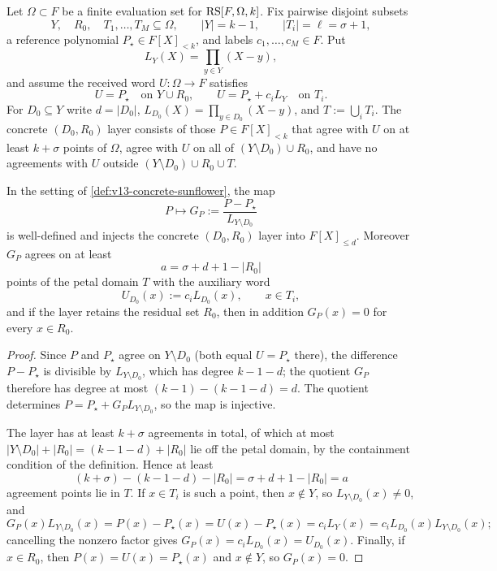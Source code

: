 \begin{definition}\label{def:v13-concrete-sunflower}
Let $\Omega\subset F$ be a finite evaluation set for $\mathrm{RS}[F,\Omega,k]$.  Fix pairwise disjoint subsets
\[
        Y,\quad R_0,\quad T_1,\ldots,T_M\subseteq\Omega,
        \qquad |Y|=k-1,
        \qquad |T_i|=\ell=\sigma+1,
\]
a reference polynomial $P_\star\in F[X]_{<k}$, and labels $c_1,\ldots,c_M\in F$.  Put
\[
        L_Y(X)=\prod_{y\in Y}(X-y),
\]
and assume the received word $U:\Omega\to F$ satisfies
\[
        U=P_\star\quad\text{on }Y\cup R_0,
        \qquad
        U=P_\star+c_iL_Y\quad\text{on }T_i .
\]
For $D_0\subseteq Y$ write $d=|D_0|$, $L_{D_0}(X)=\prod_{y\in D_0}(X-y)$, and $T:=\bigcup_iT_i$.  The concrete $(D_0,R_0)$ layer consists of those $P\in F[X]_{<k}$ that agree with $U$ on at least $k+\sigma$ points of $\Omega$, agree with $U$ on all of $(Y\setminus D_0)\cup R_0$, and have no agreements with $U$ outside $(Y\setminus D_0)\cup R_0\cup T$.
\end{definition}

\begin{proposition}\label{prop:v13-concrete-sunflower}
In the setting of \cref{def:v13-concrete-sunflower}, the map
\[
        P\longmapsto
        G_P:=\frac{P-P_\star}{L_{Y\setminus D_0}}
\]
is well-defined and injects the concrete $(D_0,R_0)$ layer into $F[X]_{\le d}$.  Moreover $G_P$ agrees on at least
\[
        a=\sigma+d+1-|R_0|
\]
points of the petal domain $T$ with the auxiliary word
\[
        U_{D_0}(x):=c_iL_{D_0}(x),\qquad x\in T_i,
\]
and if the layer retains the residual set $R_0$, then in addition $G_P(x)=0$ for every $x\in R_0$.
\end{proposition}

\begin{proof}
Since $P$ and $P_\star$ agree on $Y\setminus D_0$ \textup(both equal $U=P_\star$ there\textup), the difference $P-P_\star$ is divisible by $L_{Y\setminus D_0}$, which has degree $k-1-d$; the quotient $G_P$ therefore has degree at most $(k-1)-(k-1-d)=d$.  The quotient determines $P=P_\star+G_PL_{Y\setminus D_0}$, so the map is injective.

The layer has at least $k+\sigma$ agreements in total, of which at most $|Y\setminus D_0|+|R_0|=(k-1-d)+|R_0|$ lie off the petal domain, by the containment condition of the definition.  Hence at least
\[
        (k+\sigma)-(k-1-d)-|R_0|=\sigma+d+1-|R_0|=a
\]
agreement points lie in $T$.  If $x\in T_i$ is such a point, then $x\notin Y$, so $L_{Y\setminus D_0}(x)\ne0$, and
\[
        G_P(x)L_{Y\setminus D_0}(x)
        =P(x)-P_\star(x)
        =U(x)-P_\star(x)
        =c_iL_Y(x)
        =c_iL_{D_0}(x)L_{Y\setminus D_0}(x);
\]
cancelling the nonzero factor gives $G_P(x)=c_iL_{D_0}(x)=U_{D_0}(x)$.  Finally, if $x\in R_0$, then $P(x)=U(x)=P_\star(x)$ and $x\notin Y$, so $G_P(x)=0$.
\end{proof}


